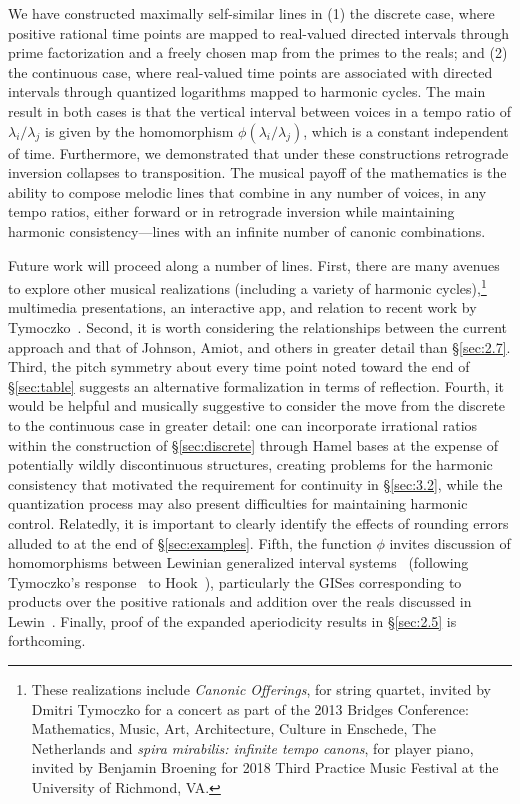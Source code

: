 \documentclass[11pt]{article}
\theoremstyle{plain}
\theoremstyle{definition}
\theoremstyle{remark}
\begin{document}
We have constructed maximally self-similar lines in (1) the discrete case, where positive rational time points are mapped to real-valued directed intervals through prime factorization and a freely chosen map from the primes to the reals; and (2) the continuous case, where real-valued time points are associated with directed intervals through quantized logarithms mapped to harmonic cycles. The main result in both cases is that the vertical interval between voices in a tempo ratio of $\lambda_i / \lambda_j$ is given by the homomorphism $\phi(\lambda_i / \lambda_j)$, which is a constant independent of time. Furthermore, we demonstrated that under these constructions retrograde inversion collapses to transposition. The musical payoff of the mathematics is the ability to compose melodic lines that combine in any number of voices, in any tempo ratios, either forward or in retrograde inversion while maintaining harmonic consistency---lines with an infinite number of canonic combinations.

Future work will proceed along a number of lines. First, there are many avenues to explore other musical realizations (including a variety of harmonic cycles),\footnote{These realizations include \emph{Canonic Offerings}, for string quartet, invited by Dmitri Tymoczko for a concert as part of the 2013 Bridges Conference: Mathematics, Music, Art, Architecture, Culture in Enschede, The Netherlands and \emph{spira mirabilis: infinite tempo canons}, for player piano, invited by Benjamin Broening for 2018 Third Practice Music Festival at the University of Richmond, VA.} multimedia presentations, an interactive app, and relation to recent work by Tymoczko~\cite{tymoczko2026}. Second, it is worth considering the relationships between the current approach and that of Johnson, Amiot, and others in greater detail than \S\ref{sec:2.7}.  Third, the pitch symmetry about every time point noted toward the end of \S\ref{sec:table} suggests an alternative formalization in terms of reflection. Fourth, it would be helpful and musically suggestive to consider the move from the discrete to the continuous case in greater detail: one can incorporate irrational ratios within the construction of \S\ref{sec:discrete} through Hamel bases at the expense of potentially wildly discontinuous structures, creating problems for the harmonic consistency that motivated the requirement for continuity in \S\ref{sec:3.2}, while the quantization process may also present difficulties for maintaining harmonic control. Relatedly, it is important to clearly identify the effects of rounding errors alluded to at the end of \S\ref{sec:examples}. Fifth, the function $\phi$ invites discussion of homomorphisms between Lewinian generalized interval systems~\cite{lewin1987} (following Tymoczko's response~\cite{tymoczko2008} to Hook~\cite{hook2007}), particularly the GISes corresponding to products over the positive rationals and addition over the reals discussed in Lewin~\cite{lewin1987}. Finally, proof of the expanded aperiodicity results in \S\ref{sec:2.5} is forthcoming.
\end{document}
